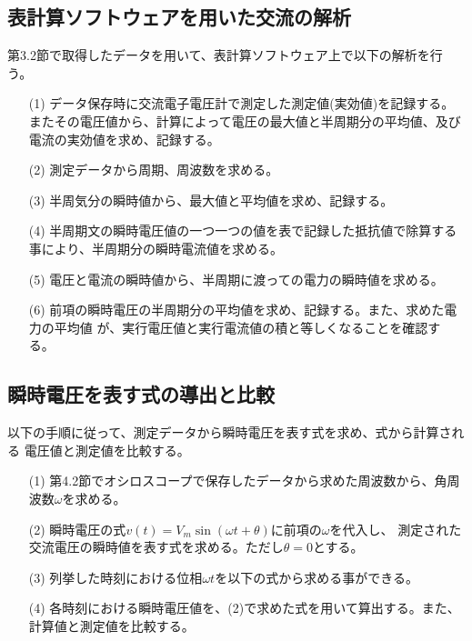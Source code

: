 \documentclass[dvipdfmx]{jsarticle}
\begin{document}
\subsection{表計算ソフトウェアを用いた交流の解析}
第3.2節で取得したデータを用いて、表計算ソフトウェア上で以下の解析を行う。
\begin{itemize}
  \item [(1)]データ保存時に交流電子電圧計で測定した測定値(実効値)を記録する。
        またその電圧値から、計算によって電圧の最大値と半周期分の平均値、及び
        電流の実効値を求め、記録する。
  \item [(2)]測定データから周期、周波数を求める。
  \item [(3)]半周気分の瞬時値から、最大値と平均値を求め、記録する。
  \item [(4)]半周期文の瞬時電圧値の一つ一つの値を表で記録した抵抗値で除算する事により、半周期分の瞬時電流値を求める。
  \item [(5)]電圧と電流の瞬時値から、半周期に渡っての電力の瞬時値を求める。
  \item [(6)]前項の瞬時電圧の半周期分の平均値を求め、記録する。また、求めた電力の平均値
            が、実行電圧値と実行電流値の積と等しくなることを確認する。
\end{itemize}
\subsection{瞬時電圧を表す式の導出と比較}
以下の手順に従って、測定データから瞬時電圧を表す式を求め、式から計算される
電圧値と測定値を比較する。
\begin{itemize}
  \item [(1)]第4.2節でオシロスコープで保存したデータから求めた周波数から、角周波数$\omega$を求める。
  \item [(2)]瞬時電圧の式$v(t) = V_m \sin(\omega t + \theta)$に前項の$\omega$を代入し、
              測定された交流電圧の瞬時値を表す式を求める。ただし$\theta = 0$とする。
  \item[(3)]列挙した時刻における位相$\omega t$を以下の式から求める事ができる。
  \item[(4)]各時刻における瞬時電圧値を、(2)で求めた式を用いて算出する。また、計算値と測定値を比較する。
\end{itemize}
\end{document}
